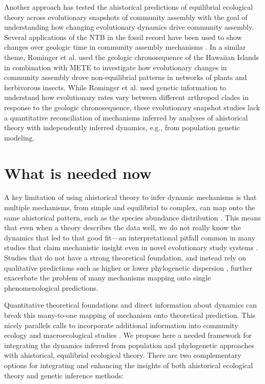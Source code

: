 \documentclass[12pt]{article}
\begin{document}
Another approach has tested the ahistorical predictions of equilibrial
ecological theory across evolutionary snapshots of community assembly
with the goal of understanding how changing evolutionary dynamics
drive community assembly. Several applications of the NTB in the
fossil record have been used to show changes over geologic time in
community assembly mechanisms \citep{Olszewski2004-ud,
  Wagner2006-te}. In a similar theme, Rominger et
al. \citep{Rominger2015-kb} used the geologic chronosequence of the
Hawaiian Islands in combination with METE to investigate how
evolutionary changes in community assembly drove non-equilibrial
patterns in networks of plants and herbivorous insects. While Rominger
et al. used genetic information to understand how evolutionary rates
vary between different arthropod clades in response to the geologic
chronosequence, these evolutionary snapshot studies lack a
quantitative reconciliation of mechanisms inferred by analyses of
ahistorical theory with independently inferred dynamics, e.g., from
population genetic modeling.

\section{What is needed now}

A key limitation of using ahistorical theory to infer dynamic
mechanisms is that multiple mechanisms, from simple and equilibrial to
complex, can map onto the same ahistorical pattern, such as the
species abundance distribution \citep{Kendall1948-pj, Kendall1948-ri,
  Engen1996-jt, Engen1996-na, McGill2003-sf}.  This means that even
when a theory describes the data well, we do not really know the
dynamics that led to that good fit---an interpretational pitfall
common in many studies that claim mechanistic insight even in novel
evolutionary study systems \citep{Hubbell2001-dx, Olszewski2004-ud,
  Wagner2006-te}.  Studies that do not have a strong theoretical
foundation, and instead rely on qualitative predictions such as higher
or lower phylogenetic dispersion \citep{Webb2002-yr}, further
exacerbate the problem of many mechanisms mapping onto single
phenomenological predictions.

Quantitative theoretical foundations and direct information about
dynamics can break this many-to-one mapping of mechanism onto
theoretical prediction. This nicely parallels calls to incorporate
additional information into community ecology and macroecological
studies \citep{McGill2007-zd}. We propose here a needed framework for
integrating the dynamics inferred from population and phylogenetic
approaches with ahistorical, equilibrial ecological theory. There are
two complementary options for integrating and enhancing the insights
of both ahistorical ecological theory and genetic inference methods:
\end{document}
